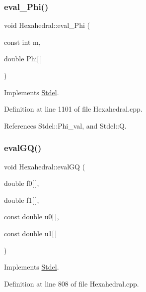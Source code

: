 \subsubsection{\texorpdfstring{eval\+\_\+\+Phi()}{eval\_Phi()}}
{\footnotesize\ttfamily void Hexahedral\+::eval\+\_\+\+Phi (\begin{DoxyParamCaption}\item[{const int}]{m,  }\item[{double}]{Phi\mbox{[}$\,$\mbox{]} }\end{DoxyParamCaption})\hspace{0.3cm}{\ttfamily [virtual]}}



Implements \hyperlink{classStdel_a2aa6ea12ceaa1fa4a7f63909ce41bc0b}{Stdel}.



Definition at line 1101 of file Hexahedral.\+cpp.



References Stdel\+::\+Phi\+\_\+val, and Stdel\+::Q.

\mbox{\label{classHexahedral_a56081550e866c3e12d0705da7d7908bf}} 
\subsubsection{\texorpdfstring{eval\+G\+Q()}{evalGQ()}\hspace{0.1cm}{\footnotesize\ttfamily [1/2]}}
{\footnotesize\ttfamily void Hexahedral\+::eval\+GQ (\begin{DoxyParamCaption}\item[{double}]{f0\mbox{[}$\,$\mbox{]},  }\item[{double}]{f1\mbox{[}$\,$\mbox{]},  }\item[{const double}]{u0\mbox{[}$\,$\mbox{]},  }\item[{const double}]{u1\mbox{[}$\,$\mbox{]} }\end{DoxyParamCaption})\hspace{0.3cm}{\ttfamily [virtual]}}



Implements \hyperlink{classStdel_aac725224c4c3433228ca6841fe7aba49}{Stdel}.



Definition at line 808 of file Hexahedral.\+cpp.



